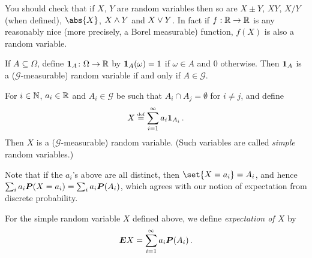 \begin{remark}
  You should check that if $X$, $Y$ are random variables then so are $X \pm Y$, $XY$, $X/Y$ (when defined), $\abs{X}$, $X \varmin Y$ and $X \varmax Y$.
  In fact if $f: \R \to \R$ is any reasonably nice (more precisely, a Borel measurable) function, $f(X)$ is also a random variable.
\end{remark}

\begin{example}
  If $A \subseteq \Omega$, define $\one_A\colon \Omega \to \R$ by $\one_A(\omega) = 1$ if $\omega \in A$ and $0$ otherwise.
  Then $\one_A$ is a ($\mathcal G$-measurable) random variable if and only if $A \in \mathcal G$.
\end{example}

\begin{example}
  For $i \in \N$,  $a_i \in \R$ and $A_i \in \mathcal G$ be such that $A_i \cap A_j = \emptyset$ for $i \neq j$, and define
  \begin{equation*}
    X\defeq \sum_{i=1}^\infty a_i \one_{A_i}\,.
  \end{equation*}
  Then $X$ is a ($\mathcal G$-measurable) random variable.
  (Such variables are called \emph{simple} random variables.)
\end{example}

Note that if the $a_i$'s above are all distinct, then $\set{X = a_i} = A_i$, and hence $\sum_i a_i \P(X = a_i) = \sum_i a_i \P(A_i)$, which agrees with our notion of expectation from discrete probability.

\begin{definition}
  For the simple random variable $X$ defined above, we define \emph{expectation of $X$} by
  \begin{equation*}
    \E X = \sum_{i = 1}^\infty a_i \P(A_i)\,.
  \end{equation*}
\end{definition}

